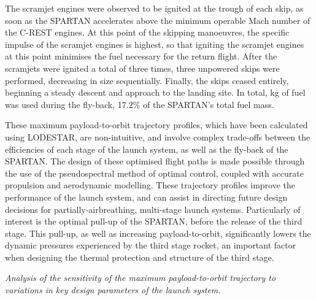  The scramjet engines were observed to be ignited at the trough of each skip, as soon as the SPARTAN accelerates above the minimum operable Mach number of the C-REST engines. At this point of the skipping manoeuvres, the specific impulse of the scramjet engines is highest, so that igniting the scramjet engines at this point minimises the fuel necessary for the return flight. 
 After the scramjets were ignited a total of three times, three unpowered skips were performed, decreasing in size sequentially. Finally, the skips ceased entirely, beginning a steady descent and approach to the landing site. 
 In total, \returnFuelStandard kg of fuel was used during the fly-back, 17.2\% of the SPARTAN's total fuel mass.
	
	These maximum payload-to-orbit trajectory profiles, which have been calculated using LODESTAR, are non-intuitive, and involve complex trade-offs between the efficiencies of each stage of the launch system, as well as the fly-back of the SPARTAN. The design of these optimised flight paths is made possible through the use of the pseudospectral method of optimal control, coupled with accurate propulsion and aerodynamic modelling.  
	These trajectory profiles improve the performance of the launch system, and can assist in directing future design decisions for partially-airbreathing, multi-stage launch systems. Particularly of interest is the optimal pull-up of the SPARTAN, before the release of the third stage. This pull-up, as well as increasing payload-to-orbit, significantly lowers the dynamic pressures experienced by the third stage rocket, an important factor when designing the thermal protection and structure of the third stage. 
	
	\vspace{10pt}
	\emph{Analysis of the sensitivity of the maximum payload-to-orbit trajectory to variations in key design parameters of the launch system.}
	
